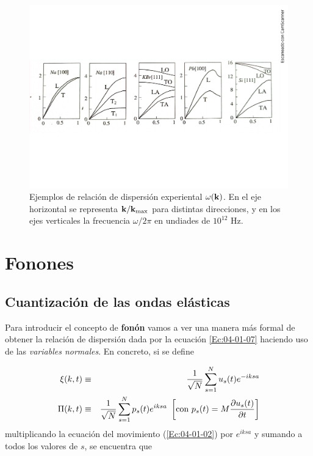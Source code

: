 \begin{figure}[h!] \centering
    \includegraphics[scale=0.42]{Cuerpo/Ch_04/Fotos libro 7.pdf}
    \caption{Ejemplos de relación de dispersión experiental $\omega (\mathbf{k})$. En el eje horizontal se representa $\mathbf{k}/\mathbf{k}_{\max}$ para distintas direcciones, y en los ejes verticales la frecuencia $\omega/2\pi$ en undiades de $10^{12}$ Hz.}
    \label{Fig:04-07}
\end{figure}    

\section{Fonones}

\subsection{Cuantización de las ondas elásticas}

Para introducir el concepto de \textbf{fonón} vamos a ver una manera más formal de obtener la relación de dispersión dada por la ecuación \ref{Ec:04-01-07} haciendo uso de las \textit{variables normales}. En concreto, si se define 

\begin{eqnarray}
    \xi (k,t) & \equiv & \frac{1}{\sqrt{N}} \sum_{s=1}^N u_s (t) e^{-iksa} \\
    \Pi (k,t) & \equiv & \frac{1}{\sqrt{N}} \sum_{s=1}^N p_s (t) e^{iksa} \ \left[ \text{con} \ p_s (t) = M \frac{\partial u_s(t)}{\partial t} \right]
\end{eqnarray}
multiplicando la ecuación del movimiento (\ref{Ec:04-01-02}) por $e^{iksa}$ y sumando a todos los valores de $s$, se encuentra que

